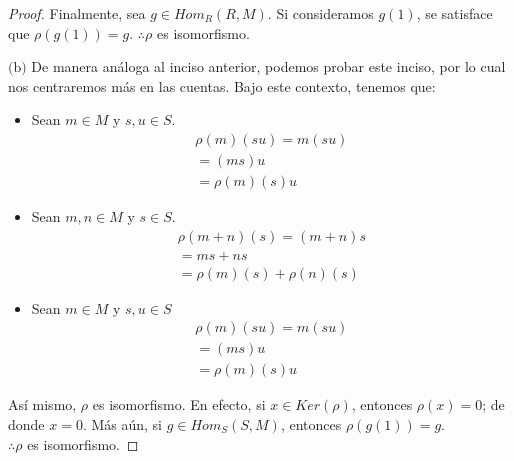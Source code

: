 \documentclass{article}
\newcommand{\lrprth}[1]{
    \left(#1\right)
}
\newcommand{\ringmodhom}[3]{
	Hom_{#1}\lrprth{#2,#3}
}
\theoremstyle{definition}
\theoremstyle{plain}
\theoremstyle{plain}
\theoremstyle{definition}
\theoremstyle{definition}
\theoremstyle{definition}
\theoremstyle{definition}
\theoremstyle{definition}
\theoremstyle{definition}
\begin{document}
\begin{enumerate}[label=\textbf{Ej \arabic*.}]
\begin{proof}
		Finalmente, sea $g \in \ringmodhom{R}{R}{M}$. Si consideramos $g\lrprth{1}$, se satisface que $\rho \lrprth{g\lrprth{1}}=g$. $\therefore\rho$ es isomorfismo.
	
		$\boxed{\text{(b)}}$ De manera análoga al inciso anterior, podemos probar este inciso, por lo cual nos centraremos más en las cuentas. Bajo este contexto, tenemos que:
		\begin{itemize}
			\item Sean $m \in M$ y $s,u \in S$.
			\begin{align*}
				\rho\lrprth{m}\lrprth{su}=m\lrprth{su}\\
				=\lrprth{ms}u\\
				=\rho\lrprth{m}\lrprth{s}u
			\end{align*}
			\item Sean $m,n \in M$ y $s \in S$.
			\begin{align*}
				\rho\lrprth{m+n}\lrprth{s}=\lrprth{m+n}s\\
				=ms+ns\\
				=\rho\lrprth{m}\lrprth{s}+\rho\lrprth{n}\lrprth{s}
			\end{align*}
			\item Sean $m \in M$ y $s,u \in S$
			\begin{align*}
				\rho\lrprth{m}\lrprth{su}=m\lrprth{su}\\
				=\lrprth{ms}u\\
				=\rho\lrprth{m}\lrprth{s}u
			\end{align*}
		\end{itemize}
	
		Así mismo, $\rho$ es isomorfismo. En efecto, si $x \in Ker\lrprth{ \rho }$, entonces $\rho \lrprth{x}=0$; de donde $x=0$. Más aún, si $g \in \ringmodhom{S}{S}{M}$, entonces $\rho \lrprth{g\lrprth{1}}=g$.\\
		$\therefore\rho$ es isomorfismo.
	\end{proof}


\end{enumerate}
\end{document}
